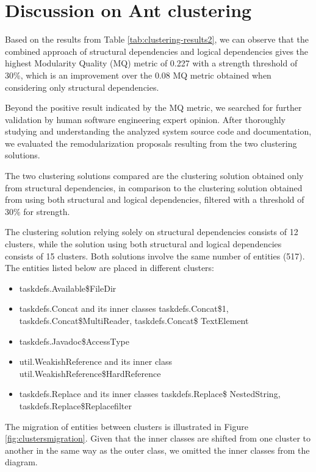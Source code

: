 \documentclass[12pt, a4paper, twoside]{report}
\begin{document}
\section{Discussion on Ant clustering}
\label{discussion_ant}

Based on the results from Table \ref{tab:clustering-results2}, we can observe that the combined approach of structural dependencies and logical dependencies gives the highest Modularity Quality (MQ) metric of 0.227 with a strength threshold of 30\%, which is an improvement over the 0.08 MQ metric obtained when considering only structural dependencies.

Beyond the positive result indicated by the MQ metric, we searched for further validation by human software engineering expert opinion. After thoroughly studying and understanding the analyzed system source code and documentation, we evaluated the remodularization proposals resulting from the two clustering solutions.

The two clustering solutions compared are the clustering solution obtained only from structural dependencies, in comparison to the clustering solution obtained from using both structural and logical dependencies, filtered with a threshold of 30\% for strength.

The clustering solution relying solely on structural dependencies consists of 12 clusters, while the solution using both structural and logical dependencies consists of 15 clusters. Both solutions involve the same number of entities (517). The entities listed below are placed in different clusters:

\begin{itemize}
    \item taskdefs.Available\$FileDir
    \item taskdefs.Concat and its inner classes taskdefs.Concat\$1, taskdefs.Concat\$MultiReader, taskdefs.Concat\$ TextElement
    \item taskdefs.Javadoc\$AccessType
    \item util.WeakishReference and its inner class util.WeakishReference\$HardReference
    \item taskdefs.Replace and its inner classes taskdefs.Replace\$ NestedString, taskdefs.Replace\$Replacefilter
\end{itemize}

The migration of entities between clusters is illustrated in Figure \ref{fig:clustersmigration}. Given that the inner classes are shifted from one cluster to another in the same way as the outer class, we omitted the inner classes from the diagram.
\end{document}
